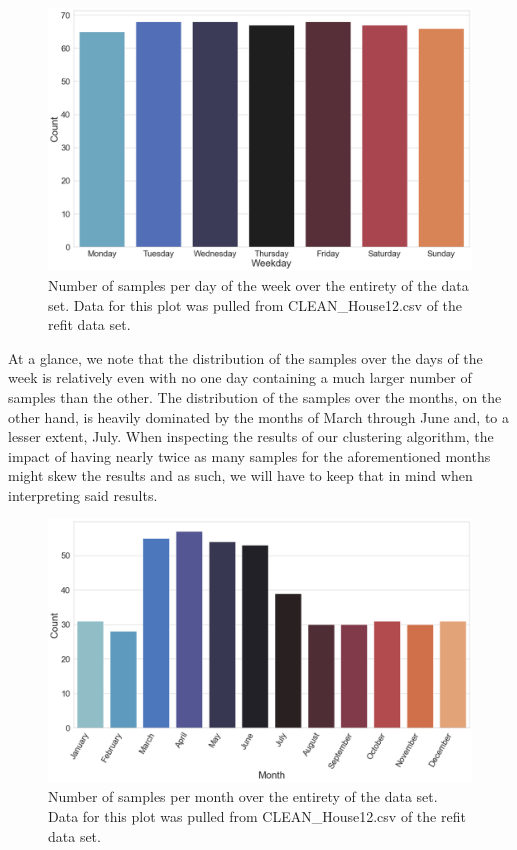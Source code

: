 \begin{figure}[H]
    \centering
    \includegraphics[width=\textwidth]{Images/Chapter 4/REFIT/REFIT-House-12-Day-of-the-Week-Count.pdf}
    \caption{Number of samples per day of the week over the entirety of the data set. Data for this plot was pulled from CLEAN\_House12.csv of the \gls{refit} data set.}
    \label{fig:REFIT-House-12-Day-of-the-Week-Count}
\end{figure}

\noindent \newline At a glance, we note that the distribution of the samples over the days of the week is relatively even with no one day containing a much larger number of samples than the other. The distribution of the samples over the months, on the other hand, is heavily dominated by the months of March through June and, to a lesser extent, July. When inspecting the results of our clustering algorithm, the impact of having nearly twice as many samples for the aforementioned months might skew the results and as such, we will have to keep that in mind when interpreting said results.

\begin{figure}[H]
    \centering
    \includegraphics[width=\textwidth]{Images/Chapter 4/REFIT/REFIT-House-12-Month-Count.pdf}
    \caption{Number of samples per month over the entirety of the data set. Data for this plot was pulled from CLEAN\_House12.csv of the \gls{refit} data set.}
    \label{fig:REFIT-House-12-Month-Count}
\end{figure}

